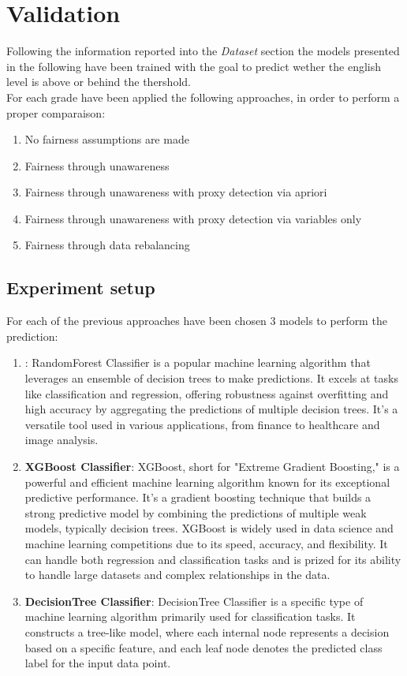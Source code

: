 \documentclass[12pt,a4paper,openright,twoside]{book}
\begin{document}
\chapter{Validation} %
\label{chap:validation}
Following the information reported into the \emph{Dataset} section the models presented in the following have been trained with the goal to predict wether the english level is above or behind the thershold. \\
For each grade have been applied the following approaches, in order to perform a proper comparaison:
\begin{enumerate}
    \item No fairness assumptions are made
    \item Fairness through unawareness
    \item Fairness through unawareness with proxy detection via apriori
    \item Fairness through unawareness with proxy detection via variables only
    \item Fairness through data rebalancing
\end{enumerate}

\section{Experiment setup}
For each of the previous approaches have been chosen 3 models to perform the prediction:
\begin{enumerate}
    \item {}: RandomForest Classifier is a popular machine learning algorithm that leverages an ensemble of decision trees to make predictions. It excels at tasks like classification and regression, offering robustness against overfitting and high accuracy by aggregating the predictions of multiple decision trees. It's a versatile tool used in various applications, from finance to healthcare and image analysis.
    \item \textbf{XGBoost Classifier}: XGBoost, short for "Extreme Gradient Boosting," is a powerful and efficient machine learning algorithm known for its exceptional predictive performance. It's a gradient boosting technique that builds a strong predictive model by combining the predictions of multiple weak models, typically decision trees. XGBoost is widely used in data science and machine learning competitions due to its speed, accuracy, and flexibility. It can handle both regression and classification tasks and is prized for its ability to handle large datasets and complex relationships in the data.
    \item \textbf{DecisionTree Classifier}: DecisionTree Classifier is a specific type of machine learning algorithm primarily used for classification tasks. It constructs a tree-like model, where each internal node represents a decision based on a specific feature, and each leaf node denotes the predicted class label for the input data point.
\end{enumerate}
\end{document}

